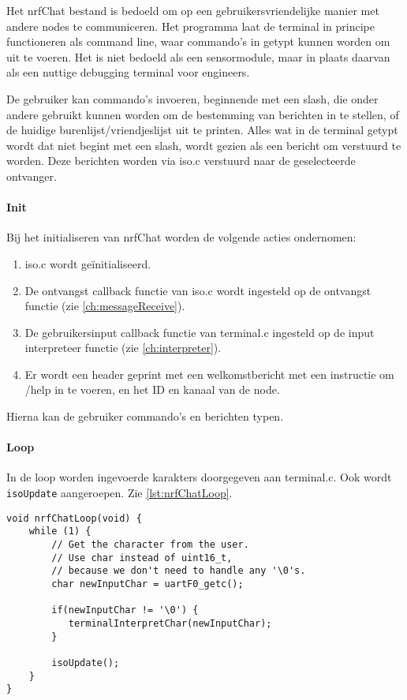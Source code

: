 
Het nrfChat bestand is bedoeld om op een gebruikersvriendelijke manier met andere nodes te communiceren. Het programma laat de terminal in principe functioneren als command line, waar commando's in getypt kunnen worden om uit te voeren. Het is niet bedoeld als een sensormodule, maar in plaats daarvan als een nuttige debugging terminal voor engineers.

De gebruiker kan commando's invoeren, beginnende met een slash, die onder andere gebruikt kunnen worden om de bestemming van berichten in te stellen, of de huidige burenlijst/vriendjeslijst uit te printen. Alles wat in de terminal getypt wordt dat niet begint met een slash, wordt gezien als een bericht om verstuurd te worden. Deze berichten worden via iso.c verstuurd naar de geselecteerde ontvanger.

\paragraph{Init}
Bij het initialiseren van nrfChat worden de volgende acties ondernomen:
\begin{enumerate}
    \item iso.c wordt geïnitialiseerd. 
    \item De ontvangst callback functie van iso.c wordt ingesteld op de ontvangst functie (zie \autoref{ch:messageReceive}).
    \item De gebruikersinput callback functie van terminal.c ingesteld op de input interpreteer functie (zie \autoref{ch:interpreter}).
    \item Er wordt een header geprint met een welkomstbericht met een instructie om /help in te voeren, en het ID en kanaal van de node.
\end{enumerate}

Hierna kan de gebruiker commando's en berichten typen.

\paragraph{Loop}
In de loop worden ingevoerde karakters doorgegeven aan terminal.c. Ook wordt \texttt{isoUpdate} aangeroepen. Zie \autoref{lst:nrfChatLoop}.

\begin{lstlisting}[caption={De nrfChat loop},captionpos=b,label={lst:nrfChatLoop},style=c,xleftmargin=.\textwidth,xrightmargin=.\textwidth]
void nrfChatLoop(void) {
    while (1) {
        // Get the character from the user.
        // Use char instead of uint16_t,
        // because we don't need to handle any '\0's.
        char newInputChar = uartF0_getc();

        if(newInputChar != '\0') {
           terminalInterpretChar(newInputChar);
        }

        isoUpdate();
    }
}
\end{lstlisting}


